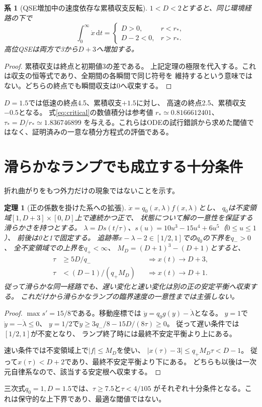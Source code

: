 \documentclass[a4paper,11pt]{ltjsarticle}
\newtheorem{theorem}[proposition]{定理}
\newtheorem{corollary}[proposition]{系}
\newcommand{\dd}{\mathrm d}
\begin{document}
\begin{corollary}[QSE増加中の速度依存な累積収支反転]
$1<D<2$とすると、同じ環境経路の下で
\begin{equation}
\int_0^\infty \dot x\,\dd t=
\begin{cases}
D>0,&r<r_*,\\
D-2<0,&r>r_*.
\end{cases}
\label{eq:cumulative}
\end{equation}
高位QSEは両方で3から$D+3$へ増加する。
\end{corollary}
\begin{proof}
累積収支は終点と初期値3の差である。
上記定理の極限を代入する。これは収支の恒等式であり、全期間の各瞬間で同じ符号を
維持するという意味ではない。どちらの終点でも瞬間収支は0へ収束する。
\end{proof}
$D=1.5$では低速の終点4.5、累積収支$+1.5$に対し、
高速の終点2.5、累積収支$-0.5$となる。
式\eqref{eq:critical}の数値積分は参考値
$r_*\simeq0.8166612401$、$\tau_*=D/r_*\simeq1.836746899$
を与える。これらはODEの試行錯誤から求めた閾値ではなく、証明済みの一意な積分方程式の評価である。

\section{滑らかなランプでも成立する十分条件}
折れ曲がりをもつ外力だけの現象ではないことを示す。
\begin{theorem}[正の係数を掛けた系への拡張]
$\dot x=q_0(x,\lambda)f(x,\lambda)$とし、
$q_0$は不変領域$[1,D+3]\times[0,D]$上で連続かつ正で、
状態について解の一意性を保証する滑らかさを持つとする。
$\lambda=D s(t/\tau)$、$s(u)=10u^3-15u^4+6u^5$（$0\le u\le1$）、
前後は0と1で固定する。
追跡帯$x-\lambda-2\in[1/2,1]$での$q_0$の下界を$q_->0$、
全不変領域での上界を$q_+<\infty$、
$M_D=(D+1)^3-(D+1)$とすると、
\begin{align}
\tau&\ge5D/q_- &&\Longrightarrow x(t)\to D+3,\\
\tau&<(D-1)/(q_+M_D) &&\Longrightarrow x(t)\to D+1.
\label{eq:smoothbounds}
\end{align}
従って滑らかな同一経路でも、遅い変化と速い変化は別の正の安定平衡へ収束する。
これだけから滑らかなランプの臨界速度の一意性までは主張しない。
\end{theorem}
\begin{proof}
$\max s'=15/8$である。移動座標では
$\dot y=q_0g(y)-\dot\lambda$となる。
$y=1$で$\dot y=-\dot\lambda\le0$、
$y=1/2$で$\dot y\ge3q_-/8-15D/(8\tau)\ge0$。
従って遅い条件では$[1/2,1]$が不変となり、
ランプ終了時には最終不安定平衡より上にある。

速い条件では不変領域上で$|f|\le M_D$を使い、
$|x(\tau)-3|\le q_+M_D\tau<D-1$。
従って$x(\tau)<D+2$であり、最終不安定平衡より下にある。
どちらも以後は一次元自律系なので、該当する安定根へ収束する。
\end{proof}
三次式$q_0=1,D=1.5$では、$\tau\ge7.5$と$\tau<4/105$
がそれぞれ十分条件となる。これは保守的な上下界であり、最適な閾値ではない。
\end{document}
